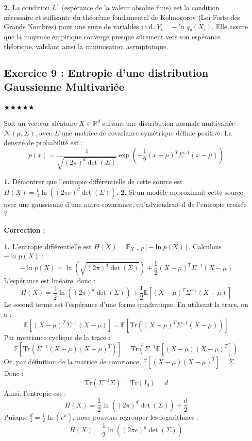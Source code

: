 \documentclass[11pt,a4paper]{article}
\begin{document}
\textbf{2.} La condition $L^1$ (espérance de la valeur absolue finie) est la condition nécessaire et suffisante du théorème fondamental de Kolmogorov (Loi Forte des Grands Nombres) pour une suite de variables i.i.d. $Y_i = - \ln q_\theta(X_i)$. Elle assure que la moyenne empirique converge presque sûrement vers son espérance théorique, validant ainsi la minimisation asymptotique.


\subsection*{Exercice 9 : Entropie d'une distribution Gaussienne Multivariée }

$\bigstar\bigstar\bigstar\bigstar\bigstar$


Soit un vecteur aléatoire $X \in \mathbb{R}^d$ suivant une distribution normale multivariée $\mathcal{N}(\mu, \Sigma)$, avec $\Sigma$ une matrice de covariance symétrique définie positive.
La densité de probabilité est :
$$p(x) = \frac{1}{\sqrt{(2\pi)^d \det(\Sigma)}} \exp\left( -\frac{1}{2} (x-\mu)^T \Sigma^{-1} (x-\mu) \right)$$

\textbf{1.} Démontrer que l'entropie différentielle de cette source est $H(X) = \frac{1}{2} \ln \left( (2\pi e)^d \det(\Sigma) \right)$.
\textbf{2.} Si un modèle approximait cette source avec une gaussienne d'une autre covariance, qu'adviendrait-il de l'entropie croisée ?

\textbf{Correction :}

\textbf{1.} L'entropie différentielle est $H(X) = \mathbb{E}_{X \sim P}[-\ln p(X)]$.
Calculons $-\ln p(X)$ :
$$-\ln p(X) = \ln \left( \sqrt{(2\pi)^d \det(\Sigma)} \right) + \frac{1}{2} (X-\mu)^T \Sigma^{-1} (X-\mu)$$
L'espérance est linéaire, donc :
$$H(X) = \frac{1}{2} \ln \left( (2\pi)^d \det(\Sigma) \right) + \frac{1}{2} \mathbb{E} \left[ (X-\mu)^T \Sigma^{-1} (X-\mu) \right]$$
Le second terme est l'espérance d'une forme quadratique. En utilisant la trace, on a :
$$\mathbb{E} \left[ (X-\mu)^T \Sigma^{-1} (X-\mu) \right] = \mathbb{E} \left[ \text{Tr}\left( (X-\mu)^T \Sigma^{-1} (X-\mu) \right) \right]$$
Par invariance cyclique de la trace :
$$\mathbb{E} \left[ \text{Tr}\left( \Sigma^{-1} (X-\mu)(X-\mu)^T \right) \right] = \text{Tr}\left( \Sigma^{-1} \mathbb{E}[(X-\mu)(X-\mu)^T] \right)$$
Or, par définition de la matrice de covariance, $\mathbb{E}[(X-\mu)(X-\mu)^T] = \Sigma$.
Donc :
$$\text{Tr}(\Sigma^{-1} \Sigma) = \text{Tr}(I_d) = d$$
Ainsi, l'entropie est :
$$H(X) = \frac{1}{2} \ln \left( (2\pi)^d \det(\Sigma) \right) + \frac{d}{2}$$
Puisque $\frac{d}{2} = \frac{1}{2} \ln(e^d)$, nous pouvons regrouper les logarithmes :
$$H(X) = \frac{1}{2} \ln \left( (2\pi e)^d \det(\Sigma) \right)$$
\end{document}
